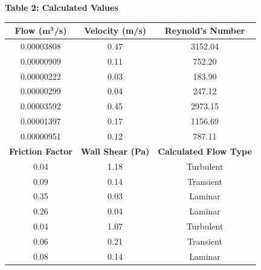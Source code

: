 \documentclass{article}
\begin{document}
\begin{center}
    
    {\large{\bf Table 2: Calculated Values\\}}
    \vspace{3mm}
    \begin{tabular}{|ccc|} 
        \hline
        \textbf{Flow ($\textbf{m}^\textbf{3}$/s)}   & \textbf{Velocity (m/s)} & \textbf{Reynold's Number}       \\ 
        \hline
        0.00003808               & 0.47                    & 3152.04                         \\
        0.00000909               & 0.11                    & 752.20                          \\
        0.00000222               & 0.03                    & 183.90                          \\
        0.00000299               & 0.04                    & 247.12                          \\
        0.00003592               & 0.45                    & 2973.15                         \\
        0.00001397               & 0.17                    & 1156.69                         \\
        0.00000951               & 0.12                    & 787.11                          \\ 
        \hline
        \textbf{Friction Factor} & \textbf{Wall Shear (Pa)}     & \textbf{Calculated Flow Type}  \\ 
        \hline
        0.04                     & 1.18                    & Turbulent                       \\
        0.09                     & 0.14                    & Transient                       \\
        0.35                     & 0.03                    & Laminar                         \\
        0.26                     & 0.04                    & Laminar                         \\
        0.04                     & 1.07                    & Turbulent                       \\
        0.06                     & 0.21                    & Transient                       \\
        0.08                     & 0.14                    & Laminar                         \\
        \hline
    \end{tabular}

\end{center}
\end{document}
